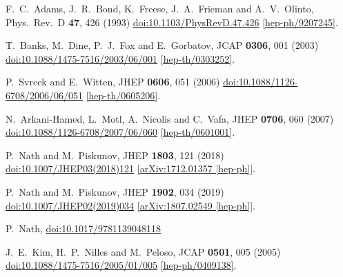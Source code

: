 \documentclass[12pt]{article}
\begin{document}
\begin{thebibliography}{99}
  F.~C.~Adams, J.~R.~Bond, K.~Freese, J.~A.~Frieman and A.~V.~Olinto,
  Phys.\ Rev.\ D {\bf 47}, 426 (1993)
  \href{https://dx.doi.org/10.1103/PhysRevD.47.426}{doi:10.1103/PhysRevD.47.426}
  \href{https://arxiv.org/abs/hep-ph/9207245}{[hep-ph/9207245]}.

  T.~Banks, M.~Dine, P.~J.~Fox and E.~Gorbatov,
  JCAP {\bf 0306}, 001 (2003)
  \href{https://dx.doi.org/10.1088/1475-7516/2003/06/001}{doi:10.1088/1475-7516/2003/06/001}
  \href{https://arxiv.org/abs/hep-th/0303252}{[hep-th/0303252]}.

  P.~Svrcek and E.~Witten,
  JHEP {\bf 0606}, 051 (2006)
  \href{https://dx.doi.org/10.1088/1126-6708/2006/06/051}{doi:10.1088/1126-6708/2006/06/051}
  \href{https://arxiv.org/abs/hep-th/0605206}{[hep-th/0605206]}.

  N.~Arkani-Hamed, L.~Motl, A.~Nicolis and C.~Vafa,
  JHEP {\bf 0706}, 060 (2007)
  \href{https://dx.doi.org/10.1088/1126-6708/2007/06/060}{doi:10.1088/1126-6708/2007/06/060}
  \href{https://arxiv.org/abs/hep-th/0601001}{[hep-th/0601001]}.


  P.~Nath and M.~Piskunov,
  JHEP {\bf 1803}, 121 (2018)
  \href{https://dx.doi.org/10.1007/JHEP03(2018)121}{doi:10.1007/JHEP03(2018)121}
  \href{https://arxiv.org/abs/1712.01357}{[arXiv:1712.01357 [hep-ph]]}.
  
  P.~Nath and M.~Piskunov,
  JHEP {\bf 1902}, 034 (2019)
  \href{https://dx.doi.org/10.1007/JHEP02(2019)034}{doi:10.1007/JHEP02(2019)034}
  \href{https://arxiv.org/abs/1807.02549}{[arXiv:1807.02549 [hep-ph]]}.
%  
  

  P.~Nath,
  \href{https://dx.doi.org/10.1017/9781139048118}{doi:10.1017/9781139048118}




  J.~E.~Kim, H.~P.~Nilles and M.~Peloso,
  JCAP {\bf 0501}, 005 (2005)
  \href{https://dx.doi.org/10.1088/1475-7516/2005/01/005}{doi:10.1088/1475-7516/2005/01/005}
  \href{https://arxiv.org/abs/hep-ph/0409138}{[hep-ph/0409138]}.


\end{thebibliography}
\end{document}

